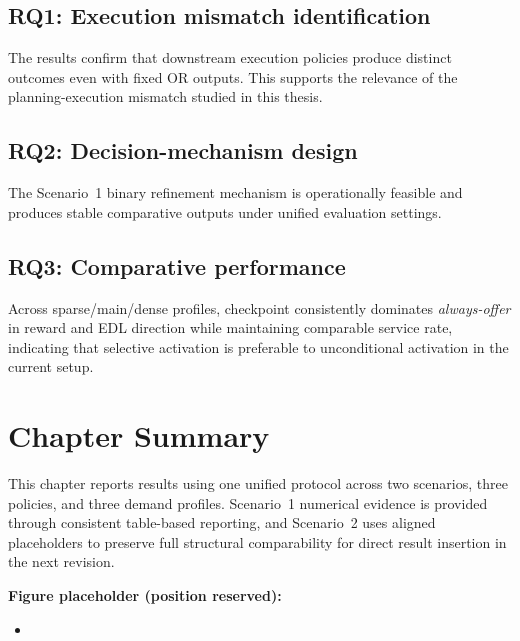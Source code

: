 \subsection*{RQ1: Execution mismatch identification}
The results confirm that downstream execution policies produce distinct outcomes even with fixed OR outputs. This supports the relevance of the planning-execution mismatch studied in this thesis.

\subsection*{RQ2: Decision-mechanism design}
The Scenario~1 binary refinement mechanism is operationally feasible and produces stable comparative outputs under unified evaluation settings.

\subsection*{RQ3: Comparative performance}
Across sparse/main/dense profiles, checkpoint consistently dominates \textit{always-offer} in reward and EDL direction while maintaining comparable service rate, indicating that selective activation is preferable to unconditional activation in the current setup.

\section{Chapter Summary}

This chapter reports results using one unified protocol across two scenarios, three policies, and three demand profiles. Scenario~1 numerical evidence is provided through consistent table-based reporting, and Scenario~2 uses aligned placeholders to preserve full structural comparability for direct result insertion in the next revision.

\textbf{Figure placeholder (position reserved):}
\begin{itemize}
\item \texttt{}
\end{itemize}
